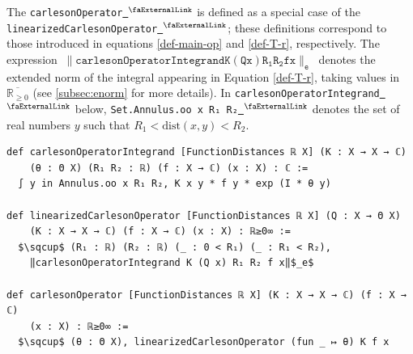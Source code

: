 \documentclass[12pt]{amsart}
\newcounter{lstlisting}[section]
\newcommand{\lean}[1]{\lstinline{#1}}
\newcommand{\mlean}[1]{\mathtt{\ #1\ }}
\newcommand*{\real}{\mathbb{R}} %
\newcommand{\ennreal}{\overline{\real_{\ge0}}}
\newcommand{\extlink}{~\ensuremath{{}^\text{\faExternalLink}}}
\theoremstyle{definition}
\theoremstyle{plain}
\begin{document}

The \lean{carlesonOperator}\href{https://github.com/fpvandoorn/carleson/blob/020d6e5c71d731952eb0379d222eea4049103ca0/Carleson/Defs.lean#L228}{\extlink} is defined as a special case of the
\lean{linearizedCarlesonOperator}\href{https://github.com/fpvandoorn/carleson/blob/020d6e5c71d731952eb0379d222eea4049103ca0/Carleson/Defs.lean#L222}{\extlink}; these definitions correspond to those introduced in equations \eqref{def-main-op} and \eqref{def-T-r}, respectively. The expression $\mlean{\|carlesonOperatorIntegrand K (Q x) R_1 R_2 f x\|_e}$ denotes the extended norm of the integral appearing in Equation \eqref{def-T-r}, taking values in $\ennreal$ (see \ref{subsec:enorm} for more details).
In \lean{carlesonOperatorIntegrand}\href{https://github.com/fpvandoorn/carleson/blob/020d6e5c71d731952eb0379d222eea4049103ca0/Carleson/Defs.lean#L216}{\extlink} below, \lean{Set.Annulus.oo x R₁ R₂}\href{https://github.com/fpvandoorn/carleson/blob/020d6e5c71d731952eb0379d222eea4049103ca0/Carleson/Defs.lean#L55}{\extlink} denotes the set of real numbers $y$ such that $R_1 < \text{dist}(x, y) < R_2$.
\begin{lstlisting}[mathescape]
def carlesonOperatorIntegrand [FunctionDistances ℝ X] (K : X → X → ℂ)
    (θ : Θ X) (R₁ R₂ : ℝ) (f : X → ℂ) (x : X) : ℂ :=
  ∫ y in Annulus.oo x R₁ R₂, K x y * f y * exp (I * θ y)

def linearizedCarlesonOperator [FunctionDistances ℝ X] (Q : X → Θ X)
    (K : X → X → ℂ) (f : X → ℂ) (x : X) : ℝ≥0∞ :=
  $\sqcup$ (R₁ : ℝ) (R₂ : ℝ) (_ : 0 < R₁) (_ : R₁ < R₂),
    ‖carlesonOperatorIntegrand K (Q x) R₁ R₂ f x‖$_e$

def carlesonOperator [FunctionDistances ℝ X] (K : X → X → ℂ) (f : X → ℂ)
    (x : X) : ℝ≥0∞ :=
  $\sqcup$ (θ : Θ X), linearizedCarlesonOperator (fun _ ↦ θ) K f x
\end{lstlisting}
\end{document}
